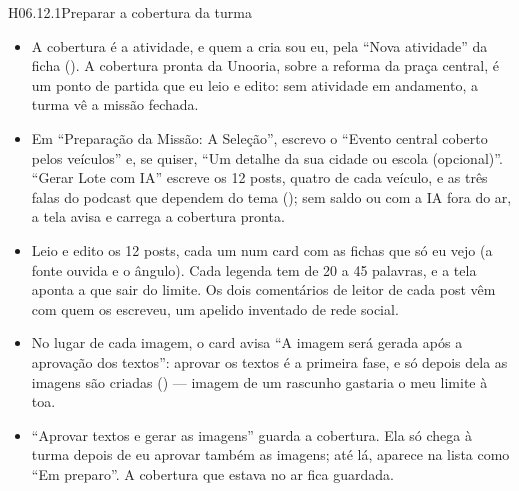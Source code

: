 \begin{historia}{H06.12.1}{Preparar a cobertura da turma}{\pronto}
\aceite
\begin{itemize}
  \item A cobertura é a atividade, e quem a cria sou eu, pela \enquote{Nova
    atividade} da ficha (). A cobertura pronta da Unooria, sobre a
    reforma da praça central, é um ponto de partida que eu leio e edito: sem
    atividade em andamento, a turma vê a missão fechada.
  \item Em \enquote{Preparação da Missão: A Seleção}, escrevo o
    \enquote{Evento central coberto pelos veículos} e, se quiser, \enquote{Um
    detalhe da sua cidade ou escola (opcional)}. \enquote{Gerar Lote com IA}
    escreve os 12 posts, quatro de cada veículo, e as três falas do podcast que
    dependem do tema (); sem saldo ou com a IA fora do ar, a tela
    avisa e carrega a cobertura pronta.
  \item Leio e edito os 12 posts, cada um num card com as fichas que só eu
    vejo (a fonte ouvida e o ângulo). Cada legenda tem de 20 a 45 palavras, e a
    tela aponta a que sair do limite. Os dois comentários de leitor de cada post
    vêm com quem os escreveu, um apelido inventado de rede social.
  \item No lugar de cada imagem, o card avisa \enquote{A imagem será gerada
    após a aprovação dos textos}: aprovar os textos é a primeira fase, e só
    depois dela as imagens são criadas () --- imagem de um
    rascunho gastaria o meu limite à toa.
  \item \enquote{Aprovar textos e gerar as imagens} guarda a cobertura. Ela só
    chega à turma depois de eu aprovar também as imagens; até lá, aparece na
    lista como \enquote{Em preparo}. A cobertura que estava no ar fica
    guardada.
\end{itemize}
\end{historia}

